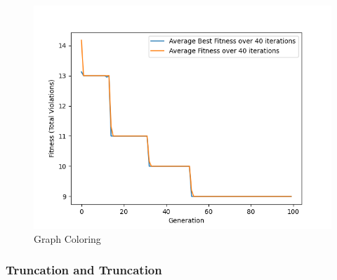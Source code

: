\documentclass[11pt, letterpaper]{article}
\begin{document}
\begin{figure}[H]
  \includegraphics[width=\linewidth]{images/graphcoloring_rb_tr.png}
  \caption{Graph Coloring}
\endminipage
\end{figure}

\subsubsection {Truncation and Truncation}
\end{document}
